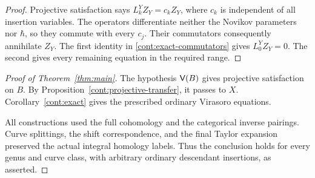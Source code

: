 \begin{proof}
Projective satisfaction says $L_k^Y Z_Y=c_k Z_Y$, where
$c_k$ is independent of all insertion variables.
The operators differentiate neither the Novikov parameters
nor $\hbar$, so they commute with every $c_j$.
Their commutators consequently annihilate $Z_Y$.
The first identity in \eqref{cont:exact-commutators}
gives $L_0^Y Z_Y=0$. The second gives every remaining
equation in the required range.
\end{proof}

\begin{proof}[Proof of Theorem~\ref{thm:main}]
The hypothesis $\mathsf V(B)$ gives projective satisfaction on $B$.
By Proposition~\ref{cont:projective-transfer}, it passes to $X$.
Corollary~\ref{cont:exact} gives the prescribed ordinary
Virasoro equations.

All constructions used the full cohomology and the
categorical inverse pairings. Curve splittings, the shift
correspondence, and the final Taylor expansion preserved
the actual integral homology labels. Thus the conclusion
holds for every genus and curve class, with arbitrary
ordinary descendant insertions, as asserted.
\end{proof}
